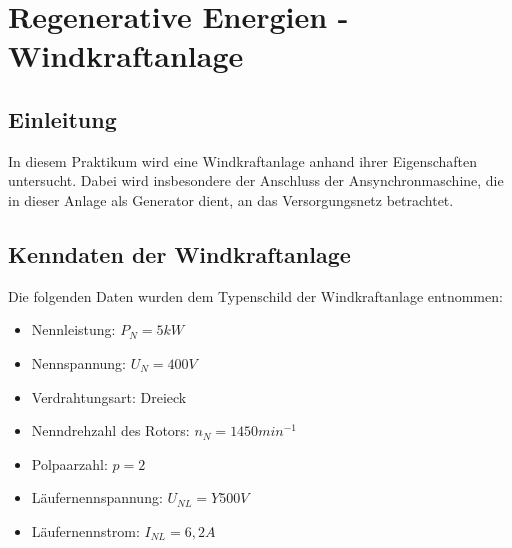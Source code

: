 \documentclass{report}
\begin{document}

\newpage

\tableofcontents

\listoffigures

\newpage

\listoftables

\newpage

\chapter{Regenerative Energien - Windkraftanlage}
\section{Einleitung}

In diesem Praktikum wird eine Windkraftanlage anhand ihrer Eigenschaften untersucht. Dabei wird insbesondere der Anschluss der Ansynchronmaschine, die in dieser Anlage als Generator dient, an das Versorgungsnetz betrachtet.

\section{Kenndaten der Windkraftanlage}

Die folgenden Daten wurden dem Typenschild der Windkraftanlage entnommen:

\begin{itemize}
	\item Nennleistung: $P_{N} = 5kW$
  \item Nennspannung: $U_{N} = 400V$
		\item Verdrahtungsart: Dreieck
	\item Nenndrehzahl des Rotors: $n_{N} = 1450min^{-1}$
	\item Polpaarzahl: $p = 2$
	\item Läufernennspannung: $U_{NL} = Y500V$
		\item Läufernennstrom: $I_{NL} = 6,2A$
\end{itemize}
\end{document}
